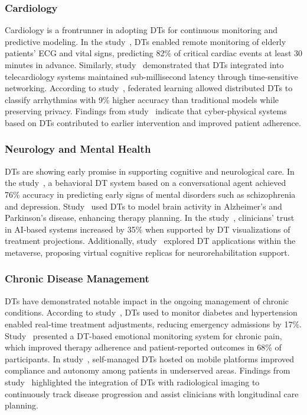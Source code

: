\documentclass[10pt,a4paper]{article}
\begin{document}
\subsubsection*{Cardiology}
Cardiology is a frontrunner in adopting DTs for continuous monitoring and predictive modeling.  
In the study~\cite{liu2019}, DTs enabled remote monitoring of elderly patients’ ECG and vital signs, predicting 82\% of critical cardiac events at least 30 minutes in advance. Similarly, study~\cite{Lu2023} demonstrated that DTs integrated into telecardiology systems maintained sub-millisecond latency through time-sensitive networking.  
According to study~\cite{Ali2023}, federated learning allowed distributed DTs to classify arrhythmias with 9\% higher accuracy than traditional models while preserving privacy.  
Findings from study~\cite{Khater2024b} indicate that cyber-physical systems based on DTs contributed to earlier intervention and improved patient adherence.

\subsubsection*{Neurology and Mental Health}
DTs are showing early promise in supporting cognitive and neurological care.  
In the study~\cite{Abilkaiyrkyzy2024}, a behavioral DT system based on a conversational agent achieved 76\% accuracy in predicting early signs of mental disorders such as schizophrenia and depression.  
Study~\cite{Fekonja2024} used DTs to model brain activity in Alzheimer’s and Parkinson’s disease, enhancing therapy planning.  
In the study~\cite{Vidovszky2024}, clinicians’ trust in AI-based systems increased by 35\% when supported by DT visualizations of treatment projections.  
Additionally, study~\cite{Siva Sai2024} explored DT applications within the metaverse, proposing virtual cognitive replicas for neurorehabilitation support.

\subsubsection*{Chronic Disease Management}
DTs have demonstrated notable impact in the ongoing management of chronic conditions.  
According to study~\cite{Venkatesh2024}, DTs used to monitor diabetes and hypertension enabled real-time treatment adjustments, reducing emergency admissions by 17\%.  
Study~\cite{Tao2019} presented a DT-based emotional monitoring system for chronic pain, which improved therapy adherence and patient-reported outcomes in 68\% of participants.  
In study~\cite{Stephanie2024}, self-managed DTs hosted on mobile platforms improved compliance and autonomy among patients in underserved areas.  
Findings from study~\cite{Panayides2020} highlighted the integration of DTs with radiological imaging to continuously track disease progression and assist clinicians with longitudinal care planning.
\end{document}
